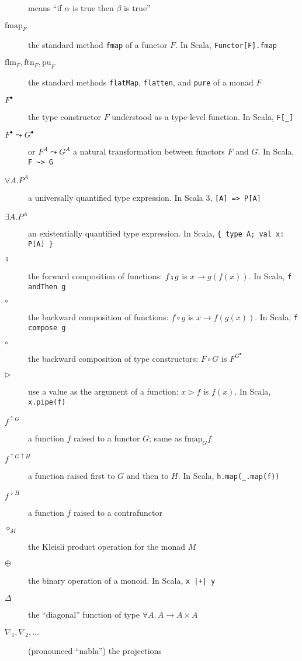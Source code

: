 \begin{description}
means \textsf{``}if $\alpha$ is true then $\beta$ is true\textsf{''}
\item [{$\text{fmap}_{F}$}] the standard method \lstinline!fmap! of a
functor $F$. In Scala, \lstinline!Functor[F].fmap!
\item [{$\text{flm}_{F},\text{ftn}_{F},\text{pu}_{F}$}] the standard methods
\lstinline!flatMap!, \lstinline!flatten!, and \lstinline!pure!
of a monad $F$
\item [{$F^{\bullet}$}] the type constructor $F$ understood as a type-level
function. In Scala, \lstinline!F[_]! 
\item [{$F^{\bullet}\leadsto G^{\bullet}$}] or $F^{A}\leadsto G^{A}$
a natural transformation between functors $F$ and $G$. In Scala,
\lstinline!F ~> G!
\item [{$\forall A.P^{A}$}] a universally quantified type expression.
In Scala 3, \lstinline![A] => P[A]!
\item [{$\exists A.P^{A}$}] an existentially quantified type expression.
In Scala, \lstinline!{ type A; val x: P[A] }! 
\item [{$\bef$}] the forward composition of functions: $f\bef g$ is $x\rightarrow g(f(x))$.
In Scala, \lstinline!f andThen g!
\item [{$\circ$}] the backward composition of functions: $f\circ g$ is
$x\rightarrow f(g(x))$. In Scala, \lstinline!f compose g!
\item [{$\circ$}] the backward composition of type constructors: $F\circ G$
is $F^{G^{\bullet}}$ 
\item [{$\triangleright$}] use a value as the argument of a function:
$x\triangleright f$ is $f(x)$. In Scala, \lstinline!x.pipe(f)!
\item [{$f^{\uparrow G}$}] a function $f$ raised to a functor $G$; same
as $\text{fmap}_{G}f$
\item [{$f^{\uparrow G\uparrow H}$}] a function raised first to $G$ and
then to $H$. In Scala, \lstinline!h.map(_.map(f))! 
\item [{$f^{\downarrow H}$}] a function $f$ raised to a contrafunctor 
\item [{$\diamond_{M}$}] the Kleisli product operation for the monad $M$
\item [{$\oplus$}] the binary operation of a monoid. In Scala, \lstinline!x |+| y!
\item [{$\Delta$}] the \textsf{``}diagonal\textsf{''} function of type $\forall A.\,A\rightarrow A\times A$
\item [{$\nabla_{1},\nabla_{2},...$}] (pronounced \textsf{``}nabla\textsf{''}) the projections

\end{description}
